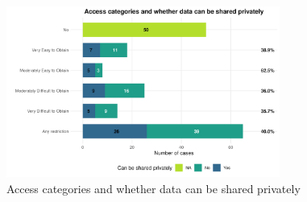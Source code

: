 
\begin{figure}
    \centering
    \includegraphics[width=0.8\textwidth]{outputs/figure_access_provision.png}
    \caption{Access categories and whether data can be shared privately}
    \label{fig:access}
\end{figure}